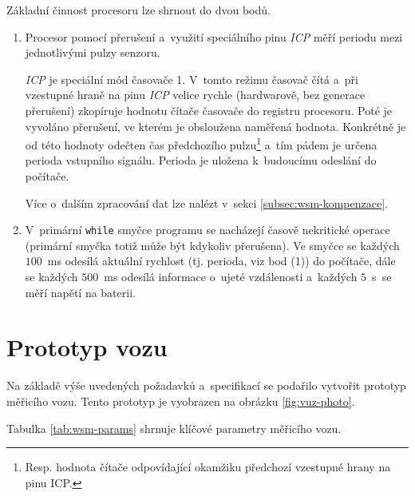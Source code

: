 Základní činnost procesoru lze shrnout do dvou bodů.

\begin{enumerate}
\item Procesor pomocí přerušení a~využití speciálního pinu \textit{\gls{ICP}}
měří periodu mezi jednotlivými pulzy senzoru.

\textit{\gls{ICP}} je speciální mód časovače 1. V~tomto režimu časovač čítá a~při
vzestupné hraně na pinu \textit{\gls{ICP}} velice rychle (hardwarově, bez generace
přerušení) zkopíruje hodnotu čítače časovače do registru procesoru. Poté je
vyvoláno přerušení, ve kterém je obsloužena naměřená hodnota. Konkrétně je od
této hodnoty odečten čas předchozího pulzu\footnote{Resp. hodnota čítače
odpovídající okamžiku předchozí vzestupné hrany na pinu \gls{ICP}.} a~tím pádem je
určena perioda vstupního signálu. Perioda je uložena k~budoucímu odeslání do
počítače.

Více o~dalším zpracování dat lze nalézt v~sekci
\ref{subsec:wsm-kompenzace}.

\item V~primární \texttt{while} smyčce programu se nacházejí časově nekritické
operace (primární smyčka totiž může být kdykoliv přerušena). Ve
smyčce se každých $100$~ms odesílá aktuální rychlost (tj. perioda, viz bod (1))
do počítače, dále se každých $500$~ms odesílá informace o~ujeté vzdálenosti
a~každých $5$~s~se měří napětí na baterii.

\end{enumerate}

\section{Prototyp vozu}
\label{sec:wsm-prototype}

Na základě výše uvedených požadavků a~specifikací se podařilo vytvořit prototyp
měřicího vozu. Tento prototyp je vyobrazen na obrázku \ref{fig:vuz-photo}.

Tabulka \ref{tab:wsm-params} shrnuje klíčové parametry měřicího vozu.

